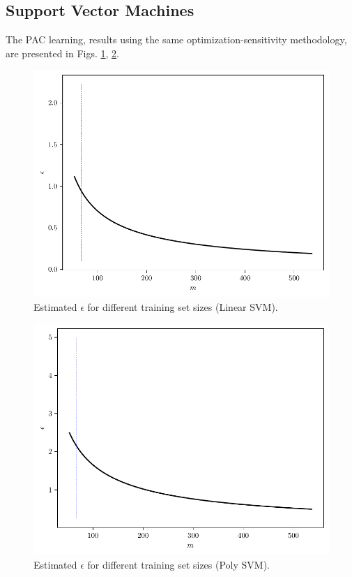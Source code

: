 \documentclass[conference]{IEEEtran}
\theoremstyle{definition}
\theoremstyle{remark}
\theoremstyle{remark}
\begin{document}
\subsection{Support Vector Machines}
The PAC learning, results using the same optimization-sensitivity methodology,
are presented in Figs. \ref{fig:error-SVM-emb}, \ref{fig:error-SVM-emb2}.

\newpage

\begin{figure}[H]
  \centering
  \includegraphics[width=0.8\columnwidth]{figs/svm-emb-linear-error.pdf}
  \caption{Estimated $\epsilon$ for different training set sizes (Linear SVM).}
  \label{fig:error-SVM-emb}
\end{figure}

\begin{figure}[H]
  \centering
  \includegraphics[width=0.8\columnwidth]{figs/svm-emb-poly-error.pdf}
  \caption{Estimated $\epsilon$ for different training set sizes (Poly SVM).}
  \label{fig:error-SVM-emb2}
\end{figure}
\end{document}
